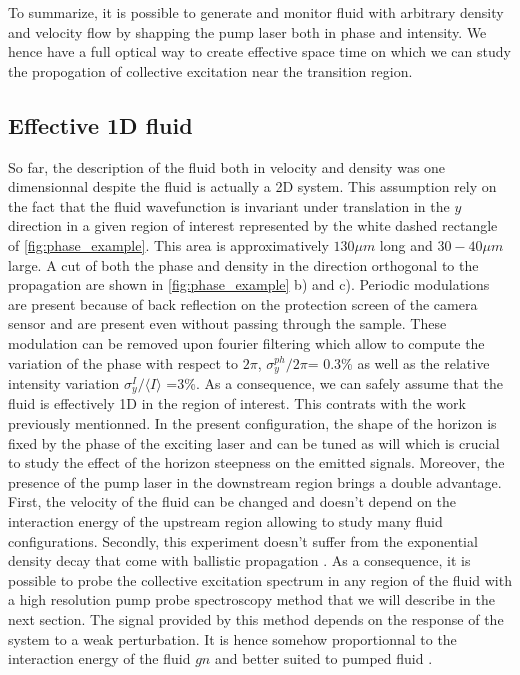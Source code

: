 \bigskip




To summarize, it is possible to generate and monitor fluid with arbitrary density and velocity flow by shapping the pump laser both in phase and intensity. We hence have a full optical way to create
effective space time on which we can study the propogation of collective excitation near the transition region.

\subsection{Effective 1D fluid}

So far, the description of the fluid both in velocity and density was one dimensionnal despite the fluid is actually a 2D system. This assumption
rely on the fact that the fluid wavefunction is invariant under translation in the $y$ direction in a given region of interest represented by the white dashed rectangle of \autoref{fig:phase_example}. This area is approximatively $130 \mu m$ long and $30-40 \mu m $ large. 
A cut of both the phase and density in the direction orthogonal to the propagation are shown in \autoref{fig:phase_example} b) and c). Periodic modulations are present because of back reflection on the protection screen of the camera sensor and are present even without passing through the sample. These modulation can be removed
upon fourier filtering which allow to compute the variation of the phase with respect to $2\pi$,  $\sigma_y^{ph}/2\pi$= 0.3\% as well as the relative intensity variation $\sigma_y^I/\langle I \rangle$ =3\%. As a consequence,
we can safely assume that the fluid is effectively 1D in the region of interest. This contrats with the work \cite{nguyen_acoustic_2015} previously mentionned. In the present configuration, the shape of the horizon is fixed by the phase of the exciting laser and can be tuned as will which is crucial to
study the effect of the horizon steepness on the emitted signals. Moreover, the presence of the pump laser in the downstream region brings a double advantage. First, the velocity of the fluid can be changed and doesn't depend on the interaction energy of the upstream region allowing to study many fluid configurations.
Secondly, this experiment doesn't suffer from the exponential density decay that come with ballistic propagation \cite{long_range_ballistic_2013}. As a consequence, it is possible to probe the collective excitation spectrum in any region of the fluid with a high resolution pump probe spectroscopy method that we will describe in the next section. The signal 
provided by this method depends on the response of the system to a weak perturbation. It is hence somehow proportionnal to the interaction energy of the fluid $gn$ and better suited to pumped fluid \cite{claude_high-resolution_2022}.

